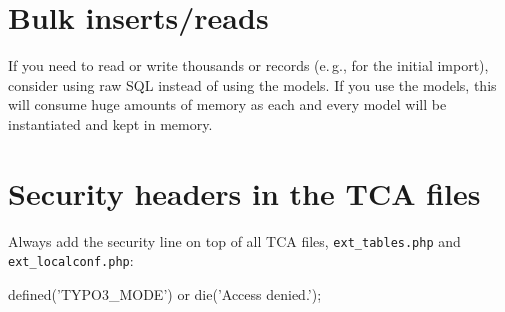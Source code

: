 \section{Bulk inserts/reads}

If you need to read or write thousands or records (e.\,g., for the initial import), consider using raw SQL instead of using the models. If you use the models, this will consume huge amounts of memory as each and every model will be instantiated and kept in memory.


\section{Security headers in the TCA files}

Always add the security line on top of all TCA files, \texttt{ext\_tables.php} and \texttt{ext\_localconf.php}:

\begin{phpcode}
defined('TYPO3_MODE') or die('Access denied.');
\end{phpcode}

